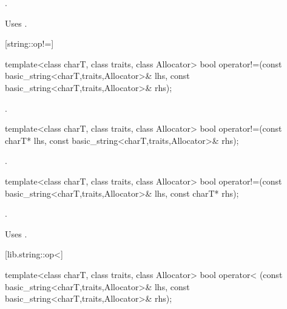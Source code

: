 \begin{itemdescr}
\pnum
\returns
{}.

\pnum
\notes
Uses .
\end{itemdescr}

%
[string::op!=]{}

%
%
\begin{itemdecl}
template<class charT, class traits, class Allocator>
  bool operator!=(const basic_string<charT,traits,Allocator>& lhs,
                  const basic_string<charT,traits,Allocator>& rhs);
\end{itemdecl}

\begin{itemdescr}
\pnum
\returns
{}.
\end{itemdescr}

%
%
\begin{itemdecl}
template<class charT, class traits, class Allocator>
  bool operator!=(const charT* lhs,
                  const basic_string<charT,traits,Allocator>& rhs);
\end{itemdecl}

\begin{itemdescr}
\pnum
\returns
{}.
\end{itemdescr}

%
%
\begin{itemdecl}
template<class charT, class traits, class Allocator>
  bool operator!=(const basic_string<charT,traits,Allocator>& lhs,
                  const charT* rhs);
\end{itemdecl}

\begin{itemdescr}
\pnum
\returns
{}.

\pnum
\notes
Uses .
\end{itemdescr}

[lib.string::op<]{}

%
%
\begin{itemdecl}
template<class charT, class traits, class Allocator>
  bool operator< (const basic_string<charT,traits,Allocator>& lhs,
                  const basic_string<charT,traits,Allocator>& rhs);
\end{itemdecl}

